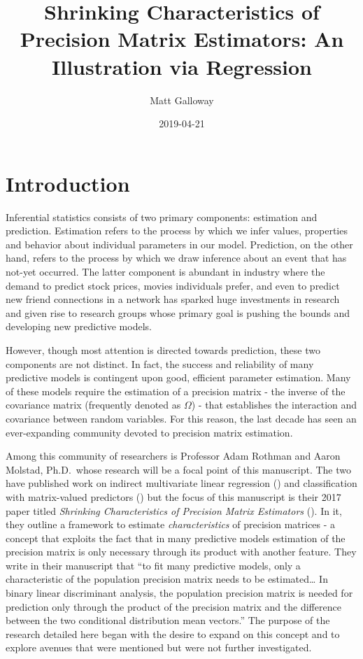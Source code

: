 \documentclass[11pt,]{report}
\title{Shrinking Characteristics of Precision Matrix Estimators: An Illustration via Regression}
\author{Matt Galloway}
\date{2019-04-21}
\theoremstyle{definition}
\theoremstyle{definition}
\theoremstyle{definition}
\theoremstyle{remark}
\begin{document}
\maketitle

{
\hypersetup{linkcolor=}
\setcounter{tocdepth}{1}
\tableofcontents
}
\hypertarget{intro}{%
\chapter{Introduction}\label{intro}}

Inferential statistics consists of two primary components: estimation and prediction. Estimation refers to the process by which we infer values, properties and behavior about individual parameters in our model. Prediction, on the other hand, refers to the process by which we draw inference about an event that has not-yet occurred. The latter component is abundant in industry where the demand to predict stock prices, movies individuals prefer, and even to predict new friend connections in a network has sparked huge investments in research and given rise to research groups whose primary goal is pushing the bounds and developing new predictive models.

However, though most attention is directed towards prediction, these two components are not distinct. In fact, the success and reliability of many predictive models is contingent upon good, efficient parameter estimation. Many of these models require the estimation of a precision matrix - the inverse of the covariance matrix (frequently denoted as \(\Omega\)) - that establishes the interaction and covariance between random variables. For this reason, the last decade has seen an ever-expanding community devoted to precision matrix estimation.

Among this community of researchers is Professor Adam Rothman and Aaron Molstad, Ph.D.~whose research will be a focal point of this manuscript. The two have published work on indirect multivariate linear regression (\citet{molstad2016indirect}) and classification with matrix-valued predictors (\citet{molstad2018penalized}) but the focus of this manuscript is their 2017 paper titled \emph{Shrinking Characteristics of Precision Matrix Estimators} (\citet{molstad2017shrinking}). In it, they outline a framework to estimate \emph{characteristics} of precision matrices - a concept that exploits the fact that in many predictive models estimation of the precision matrix is only necessary through its product with another feature. They write in their manuscript that ``to fit many predictive models, only a characteristic of the population precision matrix needs to be estimated\ldots{} In binary linear discriminant analysis, the population precision matrix is needed for prediction only through the product of the precision matrix and the difference between the two conditional distribution mean vectors.'' The purpose of the research detailed here began with the desire to expand on this concept and to explore avenues that were mentioned but were not further investigated.
\end{document}
